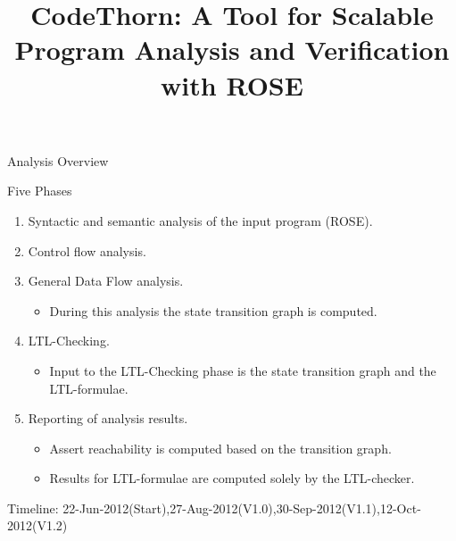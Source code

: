 




\title{CodeThorn: A Tool for Scalable Program Analysis and Verification with ROSE}


\maketitle


\begin{frame}{Analysis Overview}

\begin{block}{Five Phases}
\begin{enumerate}
\item Syntactic and semantic analysis of the input program (ROSE).
\item Control flow analysis.
\item General Data Flow analysis.
\begin{itemize}
\item During this analysis the state transition graph is computed.
\end{itemize}
\item LTL-Checking. 
\begin{itemize}
\item Input to the LTL-Checking phase is the state transition graph and the LTL-formulae.
\end{itemize}
\item Reporting of analysis results. 
\begin{itemize}
\item Assert reachability is computed based on the transition graph.
\item Results for LTL-formulae are computed solely by the LTL-checker.
\end{itemize}
\end{enumerate}

\end{block}

{\footnotesize
Timeline: 22-Jun-2012(Start),27-Aug-2012(V1.0),30-Sep-2012(V1.1),12-Oct-2012(V1.2)
}
\end{frame}

